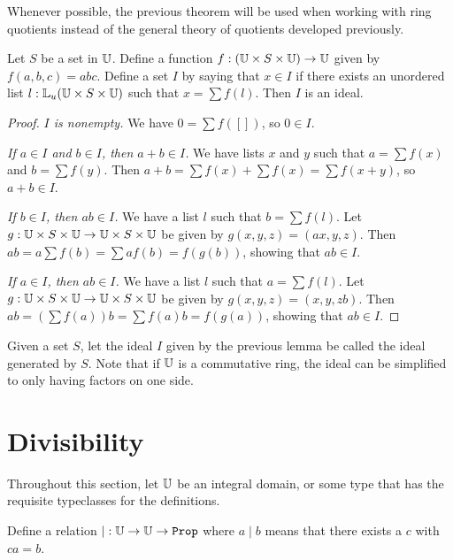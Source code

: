 \documentclass[../../math.tex]{subfiles}
\begin{document}
Whenever possible, the previous theorem will be used when working with ring
quotients instead of the general theory of quotients developed previously.

\begin{lemma}
    Let $S$ be a set in $\mathbb{U}$.  Define a function $f : (\mathbb{U} \times S \times \mathbb{U})
    \to \mathbb{U}$ given by $f(a, b, c) = abc$.  Define a set $I$ by saying that $x \in
    I$ if there exists an unordered list $l : \mathbb{L}_u(\mathbb{U} \times S \times \mathbb{U})$ such
    that $x = \sum f(l)$.  Then $I$ is an ideal.
\end{lemma}
\begin{proof}
    \textit{$I$ is nonempty.} We have $0 = \sum f([])$, so $0 \in I$.

    \textit{If $a \in I$ and $b \in I$, then $a + b \in I$.}  We have lists $x$
    and $y$ such that $a = \sum f(x)$ and $b = \sum f(y)$.  Then $a + b = \sum
    f(x) + \sum f(x) = \sum f(x + y)$, so $a + b \in I$.

    \textit{If $b \in I$, then $ab \in I$.}  We have a list $l$ such that $b =
    \sum f(l)$.  Let $g : \mathbb{U} \times S \times \mathbb{U} \to \mathbb{U} \times S \times \mathbb{U}$ be
    given by $g(x, y, z) = (ax, y, z)$.  Then $ab = a\sum f(b) = \sum af(b) =
    f(g(b))$, showing that $ab \in I$.

    \textit{If $a \in I$, then $ab \in I$.}  We have a list $l$ such that $a =
    \sum f(l)$.  Let $g : \mathbb{U} \times S \times \mathbb{U} \to \mathbb{U} \times S \times \mathbb{U}$ be
    given by $g(x, y, z) = (x, y, zb)$.  Then $ab = \left( \sum f(a) \right) b =
    \sum f(a)b = f(g(a))$, showing that $ab \in I$.
\end{proof}

\begin{definition}
    Given a set $S$, let the ideal $I$ given by the previous lemma be called the
    ideal generated by $S$.  Note that if $\mathbb{U}$ is a commutative ring, the ideal
    can be simplified to only having factors on one side.
\end{definition}

\section{Divisibility}

Throughout this section, let $\mathbb{U}$ be an integral domain, or some type that has
the requisite typeclasses for the definitions.

\begin{definition}
    Define a relation $\mathord{\mid} : \U \to \U \to \Prop$ where $a \mid b$
    means that there exists a $c$ with $ca = b$.
\end{definition}
\end{document}
